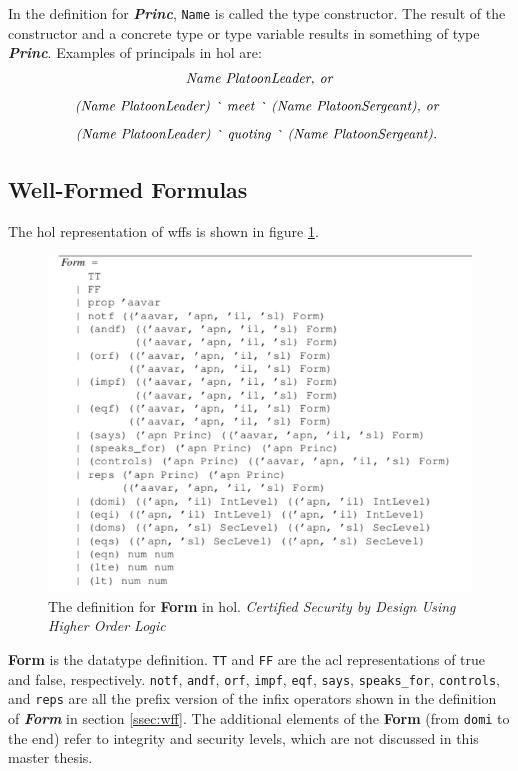 \documentclass[../../main/main.tex]{subfiles}
\begin{document}
In the definition for  \textbf{\textit{Princ}}, \texttt{Name} is called the type constructor.  The result of the constructor and a concrete type or type variable results in something of type \textbf{\textit{Princ}}.  Examples of principals in \gls{hol} are:
\[\text{\textit{Name PlatoonLeader, or}} \]
\[\text{\textit{(Name PlatoonLeader) \texttt{\textasciigrave} meet \texttt{\textasciigrave} (Name PlatoonSergeant), or }}\]
\[\text{\textit{(Name PlatoonLeader) \texttt{\textasciigrave} quoting \texttt{\textasciigrave} (Name PlatoonSergeant).} }\]

\subsection{Well-Formed Formulas}
The \gls{hol} representation of \gls{wff}s is shown in figure \ref{FormACL}.

\begin{figure}[h]
\centering
\includegraphics[width=\textwidth]{../figures/FormACL}
\caption{\label{FormACL}The definition for \textbf{Form} in \gls{hol}.   \textit{Certified Security by Design Using Higher Order Logic}\cite{certmanual}}
\end{figure}

\textbf{Form} is the datatype definition.  \texttt{TT}  and \texttt{FF} are the \gls{acl} representations of true and false, respectively.  \texttt{notf}, \texttt{andf}, \texttt{orf}, \texttt{impf}, \texttt{eqf}, \texttt{says}, \texttt{speaks_for}, \texttt{controls}, and \texttt{reps} are all the prefix version of the infix operators shown in the definition of \textbf{\textit{Form}} in section \ref{ssec:wff}.  The additional elements of the \textbf{Form} (from \texttt{domi} to the end) refer to integrity and security levels, which are not discussed in this master thesis. 
\end{document}
